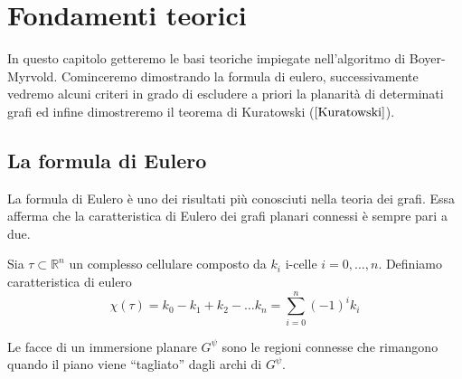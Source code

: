 \chapter{Fondamenti teorici}
In questo capitolo getteremo le basi teoriche impiegate nell'algoritmo di Boyer-Myrvold. Cominceremo dimostrando la formula di eulero, successivamente vedremo alcuni criteri in grado di escludere a priori la planarità di determinati grafi ed infine dimostreremo il teorema di Kuratowski (\(\ref{Kuratowski}\)).
\section{La formula di Eulero}
La formula di Eulero è uno dei risultati più conosciuti nella teoria dei grafi. Essa afferma che la caratteristica di Eulero dei grafi planari connessi è sempre pari a due.
\begin{definizione}\label{caratteristica-eulero}
    Sia \(\tau \subset \mathbb{R}^n\) un complesso cellulare composto da \(k_i\) i-celle \(i=0,\dots,n\). Definiamo caratteristica di eulero
    \begin{equation}
        \chi(\tau) = k_0 - k_1 + k_2 - \dots k_n = \sum_{i=0}^{n}{(-1)}^i k_i
    \end{equation}
\end{definizione}
\begin{definizione}[Facce]
    Le facce di un immersione planare \(G^\psi\) sono le regioni connesse che rimangono quando il piano viene “tagliato” dagli archi di \(G^\psi\).
\end{definizione}
